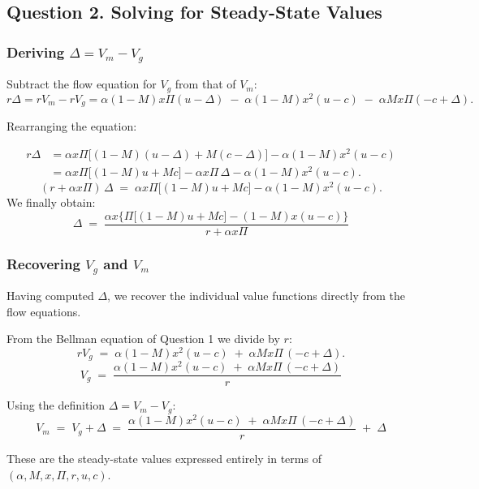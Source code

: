 \documentclass[11pt, a4paper]{article}
\begin{document}

\subsection*{Question 2. Solving for Steady-State Values}
 
\subsubsection*{Deriving $\Delta = V_m - V_g$}
 
Subtract the flow equation for $V_g$ from that of $V_m$:
\[
  r\Delta = rV_m - rV_g
          = \alpha(1-M)x\Pi(u-\Delta)
            \;-\; \alpha(1-M)x^2(u-c)
            \;-\; \alpha Mx\Pi(-c+\Delta).
\]

Rearranging the equation:

\begin{align*}
  r\Delta
  &= \alpha x\Pi\bigl[(1-M)(u-\Delta) + M(c-\Delta)\bigr]
     - \alpha(1-M)x^2(u-c) \\[4pt]
  &= \alpha x\Pi\bigl[(1-M)u + Mc\bigr]
     - \alpha x\Pi\,\Delta
     - \alpha(1-M)x^2(u-c).
\end{align*}
\[
  (r + \alpha x\Pi)\,\Delta
  \;=\; \alpha x\Pi\bigl[(1-M)u + Mc\bigr] - \alpha(1-M)x^2(u-c).
\]
We finally obtain:
\[
  \Delta \;=\;
    \frac{\alpha x\bigl\{\Pi\bigl[(1-M)u + Mc\bigr] - (1-M)x(u-c)\bigr\}}
         {r + \alpha x\Pi}
\]

\subsubsection*{Recovering $V_g$ and $V_m$}
 
Having computed $\Delta$, we recover the individual value functions directly from the flow equations. 


From the Bellman equation of Question 1 we divide by $r$:
\[
  rV_g \;=\; \alpha(1-M)x^2(u-c) \;+\; \alpha Mx\Pi\,(-c + \Delta).
\]
\[
  V_g \;=\;
    \frac{\alpha(1-M)x^2(u-c) \;+\; \alpha Mx\Pi\,(-c+\Delta)}{r}
\]
 
Using the definition $\Delta = V_m - V_g$:
\[V_m \;=\; V_g + \Delta
       \;=\; \frac{\alpha(1-M)x^2(u-c) \;+\; \alpha Mx\Pi\,(-c+\Delta)}{r}
             \;+\; \Delta
\]
 
These are the steady-state values expressed entirely in terms of $(\alpha, M, x, \Pi, r, u, c)$.
 
 
\end{document}
